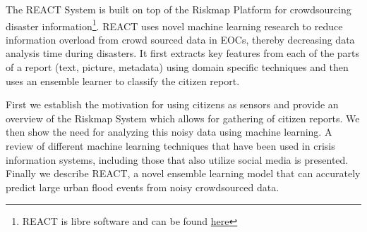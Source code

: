 The REACT System is built on top of the Riskmap Platform for crowdsourcing
disaster information\footnote{REACT is libre software and can be found
\href{http://doi.org/10.5281/zenodo.3374994}{here}}.
REACT uses novel machine learning research to reduce information overload from
crowd sourced data in EOCs, thereby decreasing data
analysis time during disasters. It first extracts key features from each of
the parts of a report (text, picture, metadata) using domain specific techniques
and then uses an ensemble learner to classify the citizen report.

First we establish the motivation for using citizens as sensors and provide an
overview of the Riskmap System which allows for gathering of citizen reports. We
then show the need for analyzing this noisy data using machine learning. A
review of different machine learning techniques that have been used in crisis
information systems, including those that also utilize social media is
presented.  Finally we describe REACT, a novel ensemble learning model that can
accurately predict large urban flood events from noisy crowdsourced data.
